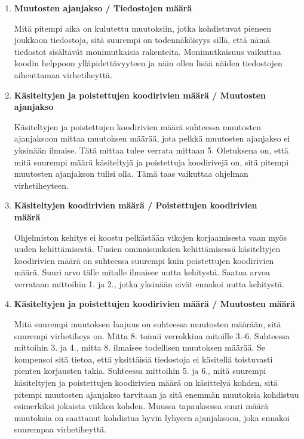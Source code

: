 \documentclass[finnish]{../tktltiki2}
\theoremstyle{definition}
\theoremstyle{remark}
\begin{document}
\begin{enumerate}
    \item {\bf Muutosten ajanjakso / Tiedostojen määrä}
    
    Mitä pitempi aika on kulutettu muutoksiin, jotka kohdistuvat pieneen joukkoon tiedostoja, sitä suurempi on todennäköisyys sillä, että nämä tiedostot sisältävät monimutkaisia rakenteita. Monimutkaisuus vaikuttaa koodin helppoon ylläpidettävyyteen ja näin ollen lisää näiden tiedostojen aiheuttamaa virhetiheyttä.

    \item {\bf Käsiteltyjen ja poistettujen koodirivien määrä / Muutosten ajanjakso}
    
    Käsiteltyjen ja poistettujen koodirivien määrä suhteessa muutosten ajanjaksoon mittaa muutoksen määrää, jota pelkkä muutosten ajanjakso ei yksinään ilmaise. Tätä mittaa tulee verrata mittaan 5. Oletuksena on, että mitä suurempi määrä käsiteltyjä ja poistettuja koodirivejä on, sitä pitempi muutosten ajanjakson tulisi olla. Tämä taas vaikuttaa ohjelman virhetiheyteen.

    \item {\bf Käsiteltyjen koodirivien määrä / Poistettujen koodirivien\\määrä}
    
    Ohjelmiston kehitys ei koostu pelkästään vikojen korjaamisesta vaan myös uuden kehittämisestä. Uusien ominaisuuksien kehittämisessä käsiteltyjen koodirivien määrä on suhteessa suurempi kuin poistettujen koodirivien määrä. Suuri arvo tälle mitalle ilmaisee uutta kehitystä. Saatua arvoa verrataan mittoihin 1. ja 2., jotka yksinään eivät ennakoi uutta kehitystä.

    \item {\bf Käsiteltyjen ja poistettujen koodirivien määrä / Muutosten määrä}
    
    Mitä suurempi muutoksen laajuus on suhteessa muutosten määrään, sitä suurempi virhetiheys on. Mitta 8. toimii verrokkina mitoille 3.-6. Suhteessa mittoihin 3. ja 4., mitta 8. ilmaisee todellisen muutoksen määrää. Se kompensoi sitä tietoa, että yksittäisiä tiedostoja ei käsitellä toistuvasti pienten korjausten takia. Suhteessa mittoihin 5. ja 6., mitä suurempi käsiteltyjen ja poistettujen koodirivien määrä on käsittelyä kohden, sitä pitempi muutosten ajanjakso tarvitaan ja sitä enemmän muutoksia kohdistuu esimerkiksi jokaista viikkoa kohden. Muussa tapauksessa suuri määrä muutoksia on saattanut kohdistua hyvin lyhyeen ajanjaksoon, joka ennakoi suurempaa virhetiheyttä.

\end{enumerate}
\end{document}
